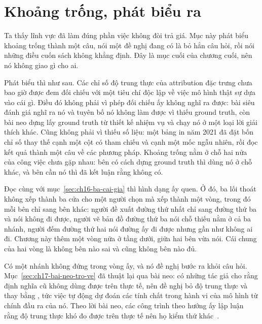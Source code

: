 \section{Khoảng trống, phát biểu ra}
\label{sec:ch18-khoang-trong-phat-bieu-ra}

%
Ta thấy lĩnh vực đã làm đúng phần việc không đòi trả giá. Mục
này phát biểu khoảng trống thành một câu, nói một đề nghị đang có là bỏ hẳn câu
hỏi, rồi nói những điều cuốn sách không khẳng định. Đây là mục cuối của chương
cuối, nên nó không giao gì cho ai.

%
Phát biểu thì như sau. Các chỉ số độ trung thực của attribution đặc trưng chưa
bao giờ được đem đối chiếu với một tiêu chí độc lập về việc mô hình thật sự dựa
vào cái gì. Điều đó không phải vì phép đối chiếu ấy không nghĩ ra được: bài siêu
đánh giá nghĩ ra nó và tuyên bố nó không làm được vì thiếu ground truth, còn bài
neo dựng lấy ground truth từ thiết kế nhiệm vụ và chạy nó ở một loại lời giải
thích khác. Cũng không phải vì thiếu số liệu: một bảng in năm 2021 đã đặt bốn chỉ
số thay thế cạnh một cột có tham chiếu và cạnh một mốc ngẫu nhiên, rồi đọc kết
quả thành một câu về các phương pháp. Khoảng trống nằm ở chỗ hai nửa của công
việc chưa gặp nhau: bên có cách dựng ground truth thì dùng nó ở chỗ khác, và bên
cần nó thì đã kết luận rằng không có.

%
Đọc cùng với mục~\ref{sec:ch16-ba-cai-gia} thì hình dạng ấy quen. Ở đó, ba lối
thoát không xếp thành ba cửa cho một người chọn mà xếp thành một vòng, trong đó
mỗi bên chỉ sang bên khác: người đề xuất đường thứ nhất chỉ sang đường thứ ba và
nói không đi được, người vẽ bản đồ đường thứ ba nói chỗ thiếu nằm ở cả ba nhánh,
người đếm đường thứ hai nói đường ấy đi được nhưng gần như không ai đi. Chương
này thêm một vòng nữa ở tầng dưới, giữa hai bên vừa nói. Cái chung của hai vòng
là không bên nào sai và cũng không bên nào đủ.

%
Có một nhánh không đứng trong vòng ấy, và nó đề nghị bước ra khỏi câu hỏi.
Mục~\ref{sec:ch17-bai-neo-tro-ve} đã thuật lại qua bài neo: có những tác giả cho
rằng định nghĩa cũ không dùng được trên thực tế, nên đề nghị bỏ độ trung thực và
thay bằng , tức việc tự động dự đoán các
tính chất trong hành vi của mô hình từ chính đầu ra của nó. Theo lời bài neo, các
công trình theo hướng ấy lập luận rằng độ trung thực khó đo được trên thực tế nên
họ kiểm thứ khác~\autocite{p21metrics}.

